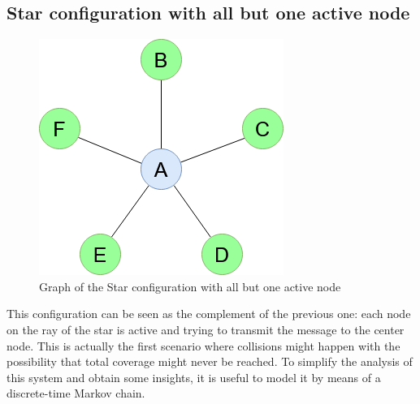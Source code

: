\subsection{Star configuration with all but one active node}
\label{ssec:star2}
\begin{figure}[H]
    \begin{center}
        \includegraphics[scale=0.5]{img/star_graph2.png}
        \caption{Graph of the Star configuration with all but one active node}
        \label{fig:single_queue}
    \end{center}
\end{figure}
This configuration can be seen as the complement of the previous one: each node
on the ray of the star is active and trying to transmit the message to the
center node. This is actually the first scenario where collisions might happen
with the possibility that total coverage might never be reached. To simplify the
analysis of this system and obtain some insights, it is useful to model it by
means of a discrete-time Markov chain.
